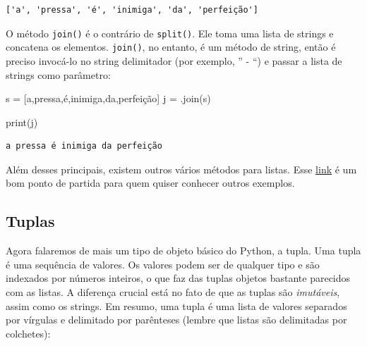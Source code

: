 \documentclass[
  brazilian,
  letterpaper,
  DIV=11,
  numbers=noendperiod]{scrreprt}
\newenvironment{Shaded}{\begin{snugshade}}{\end{snugshade}}
\newcommand{\BuiltInTok}[1]{\textcolor[rgb]{0.00,0.23,0.31}{#1}}
\newcommand{\NormalTok}[1]{\textcolor[rgb]{0.00,0.23,0.31}{#1}}
\newcommand{\OperatorTok}[1]{\textcolor[rgb]{0.37,0.37,0.37}{#1}}
\newcommand{\StringTok}[1]{\textcolor[rgb]{0.13,0.47,0.30}{#1}}
\begin{document}
\begin{verbatim}
['a', 'pressa', 'é', 'inimiga', 'da', 'perfeição']
\end{verbatim}

O método \texttt{join()} é o contrário de \texttt{split()}. Ele toma uma
lista de strings e concatena os elementos. \texttt{join()}, no entanto,
é um método de string, então é preciso invocá-lo no string delimitador
(por exemplo, '' - ``) e passar a lista de strings como parâmetro:

\begin{Shaded}
\begin{Highlighting}[]
\NormalTok{s }\OperatorTok{=}\NormalTok{ [}\StringTok{\textquotesingle{}a\textquotesingle{}}\NormalTok{,}\StringTok{\textquotesingle{}pressa\textquotesingle{}}\NormalTok{,}\StringTok{\textquotesingle{}é\textquotesingle{}}\NormalTok{,}\StringTok{\textquotesingle{}inimiga\textquotesingle{}}\NormalTok{,}\StringTok{\textquotesingle{}da\textquotesingle{}}\NormalTok{,}\StringTok{\textquotesingle{}perfeição\textquotesingle{}}\NormalTok{]}
\NormalTok{j }\OperatorTok{=} \StringTok{\textquotesingle{} \textquotesingle{}}\NormalTok{.join(s)}

\BuiltInTok{print}\NormalTok{(j)}
\end{Highlighting}
\end{Shaded}

\begin{verbatim}
a pressa é inimiga da perfeição
\end{verbatim}

Além desses principais, existem outros vários métodos para listas. Esse
\href{https://developers.google.com/edu/python/lists}{link} é um bom
ponto de partida para quem quiser conhecer outros exemplos.

\subsection{Tuplas}\label{tuplas}

Agora falaremos de mais um tipo de objeto básico do Python, a tupla. Uma
tupla é uma sequência de valores. Os valores podem ser de qualquer tipo
e são indexados por números inteiros, o que faz das tuplas objetos
bastante parecidos com as listas. A diferença crucial está no fato de
que as tuplas são \emph{imutáveis}, assim como os strings. Em resumo,
uma tupla é uma lista de valores separados por vírgulas e delimitado por
parênteses (lembre que listas são delimitadas por colchetes):
\end{document}
